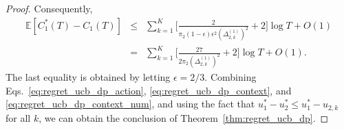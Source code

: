 \begin{proof}

Consequently,
\begin{eqnarray} \label{eq:regret_ucb_dp_context_num}
\mathbb{E}[C_1^*(T) - C_1(T)]
&\leq & \sum_{k = 1}^K \bigg[\frac{2}{\pi_2(1-\epsilon)\epsilon^2(\Delta_{2,k}^{(1)})^2} + 2\bigg]\log T + O(1) \nonumber \\
& = & \sum_{k = 1}^K \bigg[\frac{27}{2\pi_2(\Delta_{2,k}^{(1)})^2} + 2\bigg]\log T + O(1).
\end{eqnarray}
The last equality is obtained by letting $\epsilon = 2/3$.
Combining Eqs.~\eqref{eq:regret_ucb_dp_action}, \eqref{eq:regret_ucb_dp_context}, and \eqref{eq:regret_ucb_dp_context_num},  and using the fact that $u_1^* - u_2^* \leq u_1^* - u_{2,k}$ for all $k$, we can obtain the conclusion of Theorem~\ref{thm:regret_ucb_dp}.
\end{proof}
